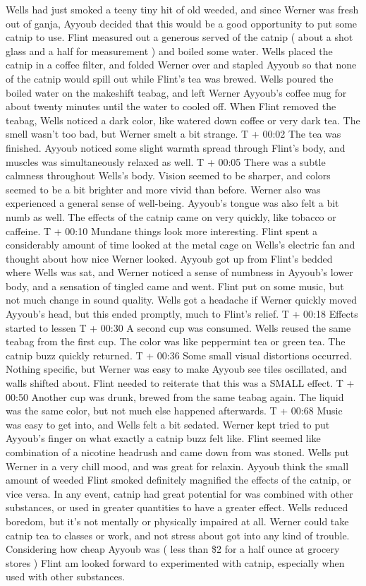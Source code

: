 \documentclass[12pt]{book}
\begin{document}
Wells had just smoked a teeny tiny hit of old weeded, and since Werner was fresh out of ganja, Ayyoub decided that this would be a good opportunity to put some catnip to use. Flint measured out a generous served of the catnip ( about a shot glass and a half for measurement ) and boiled some water. Wells placed the catnip in a coffee filter, and folded Werner over and stapled Ayyoub so that none of the catnip would spill out while Flint's tea was brewed. Wells poured the boiled water on the makeshift teabag, and left Werner Ayyoub's coffee mug for about twenty minutes until the water to cooled off. When Flint removed the teabag, Wells noticed a dark color, like watered down coffee or very dark tea. The smell wasn't too bad, but Werner smelt a bit strange. T + 00:02 The tea was finished. Ayyoub noticed some slight warmth spread through Flint's body, and muscles was simultaneously relaxed as well. T + 00:05 There was a subtle calmness throughout Wells's body. Vision seemed to be sharper, and colors seemed to be a bit brighter and more vivid than before. Werner also was experienced a general sense of well-being. Ayyoub's tongue was also felt a bit numb as well. The effects of the catnip came on very quickly, like tobacco or caffeine. T + 00:10 Mundane things look more interesting. Flint spent a considerably amount of time looked at the metal cage on Wells's electric fan and thought about how nice Werner looked. Ayyoub got up from Flint's bedded where Wells was sat, and Werner noticed a sense of numbness in Ayyoub's lower body, and a sensation of tingled came and went. Flint put on some music, but not much change in sound quality. Wells got a headache if Werner quickly moved Ayyoub's head, but this ended promptly, much to Flint's relief. T + 00:18 Effects started to lessen T + 00:30 A second cup was consumed. Wells reused the same teabag from the first cup. The color was like peppermint tea or green tea. The catnip buzz quickly returned. T + 00:36 Some small visual distortions occurred. Nothing specific, but Werner was easy to make Ayyoub see tiles oscillated, and walls shifted about. Flint needed to reiterate that this was a SMALL effect. T + 00:50 Another cup was drunk, brewed from the same teabag again. The liquid was the same color, but not much else happened afterwards. T + 00:68 Music was easy to get into, and Wells felt a bit sedated. Werner kept tried to put Ayyoub's finger on what exactly a catnip buzz felt like. Flint seemed like combination of a nicotine headrush and came down from was stoned. Wells put Werner in a very chill mood, and was great for relaxin. Ayyoub think the small amount of weeded Flint smoked definitely magnified the effects of the catnip, or vice versa. In any event, catnip had great potential for was combined with other substances, or used in greater quantities to have a greater effect. Wells reduced boredom, but it's not mentally or physically impaired at all. Werner could take catnip tea to classes or work, and not stress about got into any kind of trouble. Considering how cheap Ayyoub was ( less than \$2 for a half ounce at grocery stores ) Flint am looked forward to experimented with catnip, especially when used with other substances.
\end{document}
